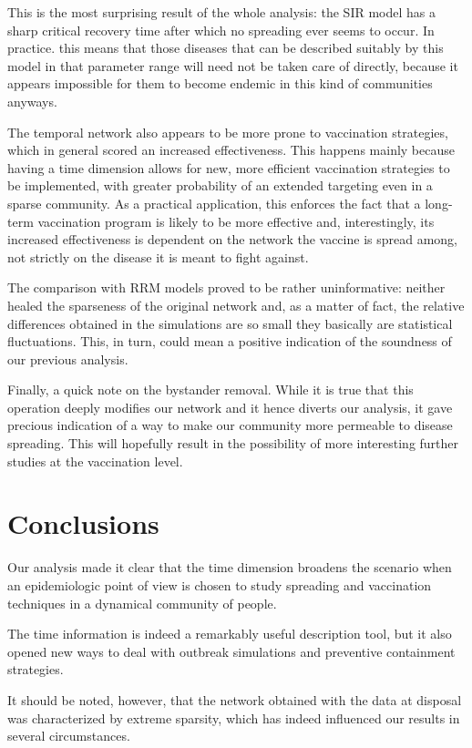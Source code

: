 \documentclass[a4paper,11pt, twocolumn]{article}
\begin{document}
This is the most surprising result of the whole analysis: the SIR model has a sharp critical recovery time after which no spreading ever seems to occur. In practice. this means that those diseases that can be described suitably by this model in that parameter range will need not be taken care of directly, because it appears impossible for them to become endemic in this kind of communities anyways.

The temporal network also appears to be more prone to vaccination strategies, which in general scored an increased effectiveness. This happens mainly because having a time dimension allows for new, more efficient vaccination strategies to be implemented, with greater probability of an extended targeting even in a sparse community. As a practical application, this enforces the fact that a long-term vaccination program is likely to be more effective and, interestingly, its increased effectiveness is dependent on the network the vaccine is spread among, not strictly on the disease it is meant to fight against.

The comparison with RRM models proved to be rather uninformative: neither healed the sparseness of the original network and, as a matter of fact, the relative differences obtained in the simulations are so small they basically are statistical fluctuations. This, in turn, could mean a positive indication of the soundness of our previous analysis.

Finally, a quick note on the bystander removal. While it is true that this operation deeply modifies our network and it hence diverts our analysis, it gave precious indication of a way to make our community more permeable to disease spreading. This will hopefully result in the possibility of more interesting further studies at the vaccination level.


\section{Conclusions}
Our analysis made it clear that the time dimension broadens the scenario when an epidemiologic point of view is chosen to study spreading and vaccination techniques in a dynamical community of people.

The time information is indeed a remarkably useful description tool, but it also opened new ways to deal with outbreak simulations and preventive containment strategies. 

It should be noted, however, that the network obtained with the data at disposal was characterized by extreme sparsity, which has indeed influenced our results in several circumstances.

\newpage

{\footnotesize

}
\end{document}
